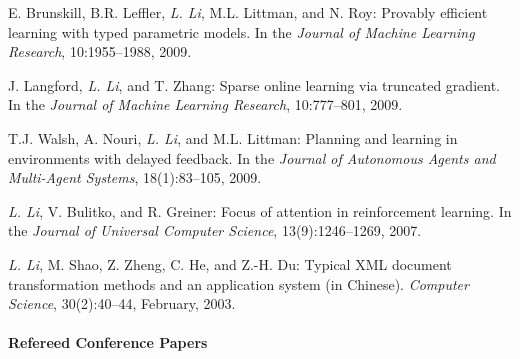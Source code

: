 \documentclass[10pt,twoside,letterpaper]{article}
\newcommand{\selffont}[1]{{\textit{#1}}}
\newcommand{\venuefont}[1]{{\textit{#1}}}
\newcommand{\negitemspace}{\vspace{1mm}}
\newcommand{\myself}{\selffont{L. Li}}
\begin{document}
\begin{compactenum}[(J1)]
\item{E. Brunskill, B.R. Leffler, \myself, M.L. Littman,
and N. Roy: Provably efficient learning with typed parametric
models.  In the \venuefont{Journal of Machine Learning Research},
10:1955--1988, 2009.}

\item{J. Langford, \myself, and T. Zhang: Sparse online
learning via truncated gradient. In the \venuefont{Journal of Machine
Learning Research}, 10:777--801, 2009.}

\item{T.J. Walsh, A. Nouri, \myself, and M.L. Littman:
Planning and learning in environments with delayed feedback. In
the \venuefont{Journal of Autonomous Agents and Multi-Agent
Systems}, 18(1):83--105, 2009.}

\item{\myself, V. Bulitko, and R. Greiner: Focus of
attention in reinforcement learning. In the \venuefont{Journal of
Universal Computer Science}, 13(9):1246--1269, 2007.}

\item{\myself, M. Shao, Z. Zheng, C. He, and Z.-H. Du:
Typical XML document transformation methods and an application
system (in Chinese). \venuefont{Computer Science}, 30(2):40--44,
February, 2003.}

\end{compactenum}

\paragraph{Refereed Conference Papers} \negitemspace
\end{document}
